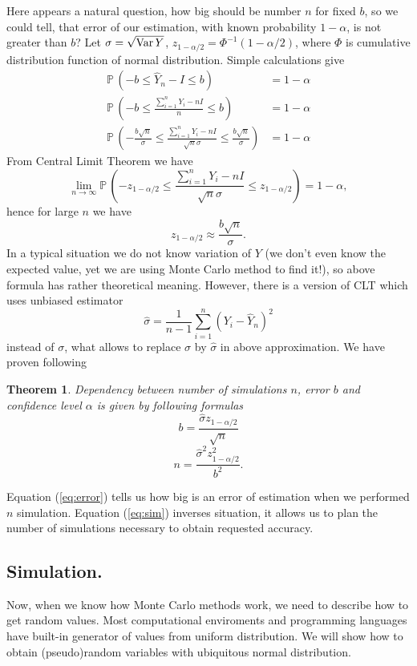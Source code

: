 \documentclass[a4paper,12pt, twoside]{book}
\newtheorem{thm}{Theorem}[section]
\theoremstyle{definition}
\theoremstyle{remark}
\def\Var{{\rm Var}\,}
\def\P{{\mathbb{P}}\,}
\def\limn{\lim\limits_{n \rightarrow \infty} }
\begin{document}
Here appears a natural question, how big should be number $n$ for fixed $b$, so we could tell, that error of our estimation, with known probability $1-\alpha$, is not greater than $b$?
Let $\sigma = \sqrt{\Var{Y}}$, $z_{1-\alpha/2} = \Phi^{-1}(1-\alpha/2)$, where $\Phi$ is cumulative distribution function of normal distribution. Simple calculations give
\begin{align*}
 \P(-b \leq \hat{Y}_n - I \leq b) &= 1 - \alpha\\
 \P(-b \leq \frac{\sum\limits_{i=1}^n Y_i - nI}{n}  \leq b) &= 1 - \alpha\\
 \P(-\frac{b\sqrt{n}}{\sigma} \leq \frac{\sum\limits_{i=1}^n Y_i - nI}{\sqrt{n}\sigma}  \leq \frac{b\sqrt{n}}{\sigma}) &= 1 - \alpha
\end{align*}
From Central Limit Theorem we have
\[ \limn \P(-z_{1-\alpha/2} \leq \frac{\sum\limits_{i=1}^n Y_i - nI}{\sqrt{n}\sigma}  \leq z_{1-\alpha/2}) = 1 - \alpha, \]
hence for large $n$ we have
\[z_{1-\alpha/2} \approx \frac{b\sqrt{n}}{\sigma}.\]
In a typical situation we do not know variation of $Y$ (we don't even know the expected value, yet we are using Monte Carlo method to find it!), so above formula has rather theoretical meaning. However, there is a version of CLT which uses unbiased estimator
\[ \hat{\sigma} = \frac{1}{n-1}\sum\limits_{i=1}^n (Y_i - \hat{Y}_n)^2 \]
instead of $\sigma$, what allows to replace $\sigma$ by $\hat{\sigma}$ in above approximation. We have proven following 
\begin{thm}
 Dependency between number of simulations $n$, error $b$ and confidence level $\alpha$ is given by following formulas
 \begin{equation}
   \label{eq:error}
   b = \frac{\hat{\sigma} z_{1-\alpha/2}}{\sqrt{n}}
 \end{equation}
 \begin{equation}
   \label{eq:sim}
   n = \frac{\hat{\sigma}^2 z_{1-\alpha/2}^2}{b^2}.
 \end{equation}
\end{thm}
\noindent Equation (\ref{eq:error}) tells us how big is an error of estimation when we performed $n$ simulation. Equation (\ref{eq:sim}) inverses situation, it allows us to plan the number of simulations necessary to obtain requested accuracy.

\subsection{Simulation.}
Now, when we know how Monte Carlo methods work, we need to describe how to get random values. Most computational enviroments and programming languages have built-in generator of values from uniform distribution. We will show how to obtain (pseudo)random variables with ubiquitous normal distribution.
\end{document}
